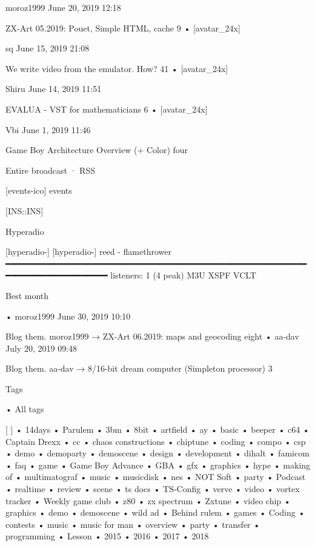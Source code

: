     moroz1999 June 20, 2019 12:18

    ZX-Art 05.2019: Pouet, Simple HTML, cache 9
  • [avatar_24x]

    sq June 15, 2019 21:08

    We write video from the emulator. How? 41
  • [avatar_24x]

    Shiru June 14, 2019 11:51

    EVALUA - VST for mathematicians 6
  • [avatar_24x]

    Vbi June 1, 2019 11:46

    Game Boy Architecture Overview (+ Color) four

Entire broadcast · RSS


[events-ico] events

[INS::INS]

Hyperadio

                                 [hyperadio-]
                                 [hyperadio-]
                              reed - flamethrower
━━━━━━━━━━━━━━━━━━━━━━━━━━━━━━━━━━━━━━━━━━━━━━━━━━━━━━━━━━━━━━━━━━━━━━━━━━━━━━━
                             listeners: 1 (4 peak)
                                 M3U XSPF VCLT

Best month

  • moroz1999 June 30, 2019 10:10

    Blog them. moroz1999 → ZX-Art 06.2019: maps and geocoding eight
  • aa-dav July 20, 2019 09:48

    Blog them. aa-dav → 8/16-bit dream computer (Simpleton processor) 3

Tags

  • All tags

[                    ]
  • 14days
  • Parulem
  • 3bm
  • 8bit
  • artfield
  • ay
  • basic
  • beeper
  • c64
  • Captain Drexx
  • cc
  • chaos constructions
  • chiptune
  • coding
  • compo
  • csp
  • demo
  • demoparty
  • demoscene
  • design
  • development
  • dihalt
  • famicom
  • faq
  • game
  • Game Boy Advance
  • GBA
  • gfx
  • graphics
  • hype
  • making of
  • multimatograf
  • music
  • musicdisk
  • nes
  • NOT Soft
  • party
  • Podcast
  • realtime
  • review
  • scene
  • ts docs
  • TS-Config
  • verve
  • video
  • vortex tracker
  • Weekly game club
  • z80
  • zx spectrum
  • Zxtune
  • video chip
  • graphics
  • demo
  • demoscene
  • wild ad
  • Behind rulem
  • games
  • Coding
  • contests
  • music
  • music for man
  • overview
  • party
  • transfer
  • programming
  • Lesson
  • 2015
  • 2016
  • 2017
  • 2018

